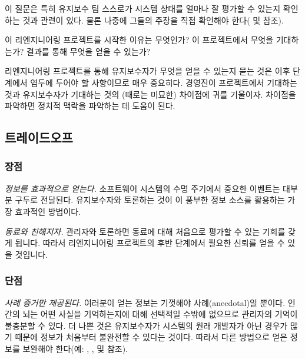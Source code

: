 \documentclass[a4paper,10pt,twoside]{book}
\begin{document}
\begin{bulletlist}
이 질문은 특히 유지보수 팀 스스로가 시스템 상태를 얼마나 잘 평가할 수 있는지 확인하는 것과 관련이 있다. 물론 나중에 그들의 주장을 직접 확인해야 한다( 및  참조).

  \item 이 리엔지니어링 프로젝트를 시작한 이유는 무엇인가? 이 프로젝트에서 무엇을 기대하는가? 결과를 통해 무엇을 얻을 수 있는가?

리엔지니어링 프로젝트를 통해 유지보수자가 무엇을 얻을 수 있는지 묻는 것은 이후 단계에서 염두에 두어야 할 사항이므로 매우 중요히다. 경영진이 프로젝트에서 기대하는 것과 유지보수자가 기대하는 것의 (때로는 미묘한) 차이점에 귀를 기울이자. 차이점을 파악하면 정치적 맥락을 파악하는 데 도움이 된다.

\end{bulletlist}

\subsection*{트레이드오프}

\subsubsection*{장점}
\begin{bulletlist}
  \item \emph{정보를 효과적으로 얻는다.}
소프트웨어 시스템의 수명 주기에서 중요한 이벤트는 대부분 구두로 전달된다. 유지보수자와 토론하는 것이 이 풍부한 정보 소스를 활용하는 가장 효과적인 방법이다.

  \item \emph{동료와 친해지자.}
관리자와 토론하면 동료에 대해 처음으로 평가할 수 있는 기회를 갖게 됩니다. 따라서 리엔지니어링 프로젝트의 후반 단계에서 필요한 신뢰를 얻을 수 있을 것입니다.

\end{bulletlist}

\subsubsection*{단점}

\begin{bulletlist}
  \item \emph{사례 증거만 제공된다.}
여러분이 얻는 정보는 기껏해야 사례(anecdotal)일 뿐이다. 인간의 뇌는 어떤 사실을 기억하는지에 대해 선택적일 수밖에 없으므로 관리자의 기억이 불충분할 수 있다. 더 나쁜 것은 유지보수자가 시스템의 원래 개발자가 아닌 경우가 많기 때문에 정보가 처음부터 불완전할 수 있다는 것이다. 따라서 다른 방법으로 얻은 정보를 보완해야 한다(예: , ,  및  참조).

\end{bulletlist}
\end{document}

